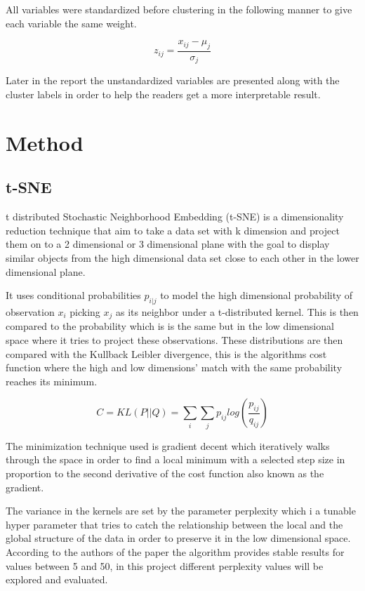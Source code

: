 \documentclass{article}
\begin{document}
All variables were standardized before clustering in the following manner to give each variable the same weight.

 $$z_{ij} = \frac{x_{ij} - \mu_{j}}{\sigma_{j}}$$ 

Later in the report the unstandardized variables are presented along with the cluster labels in order to help the readers get a more interpretable result.


\newpage


\section{Method}

\subsection{t-SNE}


t distributed Stochastic Neighborhood Embedding (t-SNE) is a dimensionality reduction technique that aim to take a data set with k dimension and project them on to a 2 dimensional or 3 dimensional plane with the goal to display similar objects from the high dimensional data set close to each other in the lower dimensional plane.

It uses conditional probabilities $p_{i|j}$  to model the high dimensional probability of observation $x_i$ picking $x_j$ as its neighbor under a t-distributed kernel. This is then compared to the probability  which is is the same but in the low dimensional space where it tries to project these observations. These distributions are then compared with the Kullback Leibler divergence, this is the algorithms cost function where the high and low dimensions’ match with the same probability reaches its minimum.

$$C = KL(P||Q)=\sum_i\sum_jp_{ij}log(\frac{p_{ij}}{q_{ij}})$$

The minimization technique used is gradient decent which iteratively walks through the space in order to find a local minimum with a selected step size in proportion to the second derivative of the cost function also known as the gradient.

The variance in the kernels are set by the parameter perplexity which i a tunable hyper parameter that tries to catch the relationship between the local and the global structure of the data in order to preserve it in the low dimensional space. According to the authors of the paper the algorithm provides stable results for values between 5 and 50, in this project different perplexity values will be explored and evaluated. \cite{ictdbid:2777}
\end{document}
